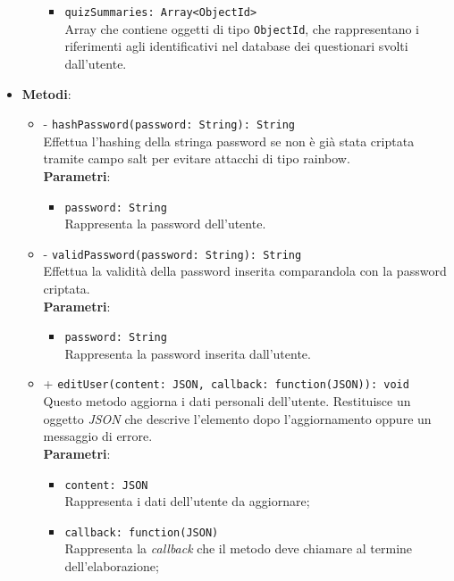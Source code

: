 \begin{itemize}
\begin{itemize}
\begin{itemize}
				\item
					\texttt{quizSummaries: Array<ObjectId>}\\ Array che contiene oggetti di tipo \texttt{ObjectId}, che rappresentano i riferimenti agli identificativi nel database dei questionari svolti dall'utente.		
			\end{itemize}	
		\end{itemize}	
	\item \textbf{Metodi}:
		\begin{itemize}
		\item
		- \texttt{hashPassword(password: String): String} \\
		Effettua l'hashing della stringa password se non è già stata criptata tramite campo salt per evitare attacchi di tipo rainbow. \\
		\textbf{Parametri}: 
			\begin{itemize}
			\item
				 \texttt{password: String} \\
				Rappresenta la password dell'utente.
			\end{itemize}
		\item
		- \texttt{validPassword(password: String): String} \\
		Effettua la validità della password inserita comparandola con la password criptata.	\\
		\textbf{Parametri}: 
			\begin{itemize}
			\item
				\texttt{password: String} \\
				Rappresenta la password inserita dall'utente.
			\end{itemize}
		\item
		+ \texttt{editUser(content: JSON, callback: function(JSON)): void} \\
		Questo metodo aggiorna i dati personali dell'utente. Restituisce un oggetto \textit{JSON} che descrive l'elemento dopo l'aggiornamento oppure un messaggio di errore.	\\
		\textbf{Parametri}: 
			\begin{itemize}
			\item
				\texttt{content: JSON} \\
				Rappresenta i dati dell'utente da aggiornare;
			\item	
				\texttt{callback: function(JSON)} \\
				Rappresenta la \textit{callback} che il metodo deve chiamare al termine dell'elaborazione;
			\end{itemize}	

\end{itemize}
\end{itemize}
